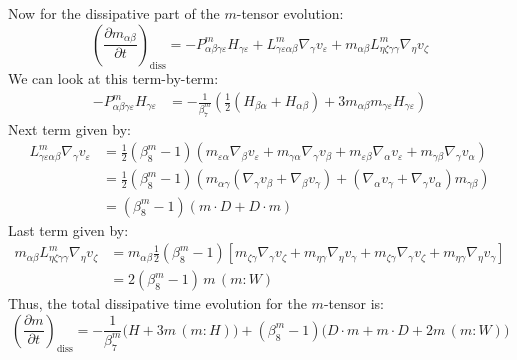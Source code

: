 \documentclass[reqno]{article}
\begin{document}
  Now for the dissipative part of the $m$-tensor evolution:
  \begin{equation}
    \left( \frac{\partial m_{\alpha\beta}}{\partial t} \right)_\text{diss}
    =
    - P^m_{\alpha\beta\gamma\varepsilon} H_{\gamma\varepsilon}
    + L^m_{\gamma\varepsilon\alpha\beta} \nabla_\gamma v_\varepsilon
    + m_{\alpha\beta} L^m_{\eta\zeta\gamma\gamma} \nabla_\eta v_\zeta
  \end{equation}
  We can look at this term-by-term:
  \begin{equation}
    \begin{split}
      - P^m_{\alpha\beta\gamma\varepsilon} H_{\gamma\varepsilon}
      &=
      - \frac{1}{\beta^m_7} \left( \tfrac12 \left(
        H_{\beta \alpha}
        + H_{\alpha\beta}
      \right)
      + 3 m_{\alpha\beta} m_{\gamma\varepsilon} H_{\gamma\varepsilon}
      \right)
    \end{split}
  \end{equation}
  Next term given by:
  \begin{equation}
    \begin{split}
    L^m_{\gamma\varepsilon\alpha\beta} \nabla_\gamma v_\varepsilon
    &= 
    \tfrac12 \left( \beta^m_8 - 1 \right)
    \left(
      m_{\varepsilon\alpha} \nabla_\beta v_\varepsilon
      + m_{\gamma\alpha} \nabla_\gamma v_\beta
      + m_{\varepsilon\beta} \nabla_\alpha v_\varepsilon
      + m_{\gamma\beta} \nabla_\gamma v_\alpha
    \right) \\
    &=
    \tfrac12 \left( \beta^m_8 - 1 \right)
    \left(
      m_{\alpha\gamma} \left(
        \nabla_\gamma v_\beta
        + \nabla_\beta v_\gamma
      \right)
      + 
       \left(
         \nabla_\alpha v_\gamma
         + \nabla_\gamma v_\alpha
      \right) m_{\gamma \beta}
    \right) \\
    &= \left( \beta^m_8 - 1 \right) \left( m \cdot D + D \cdot m \right)
    \end{split}
  \end{equation}
  Last term given by:
  \begin{equation}
    \begin{split}
    m_{\alpha\beta} L^m_{\eta\zeta\gamma\gamma} \nabla_\eta v_\zeta
    &= m_{\alpha\beta} \tfrac12 \left( \beta^m_8 - 1 \right) \left[
      m_{\zeta\gamma} \nabla_\gamma v_\zeta
      + m_{\eta \gamma} \nabla_\eta v_\gamma
      + m_{\zeta\gamma} \nabla_\gamma v_\zeta
      + m_{\eta\gamma} \nabla_\eta v_\gamma
    \right] \\
    &= 2 \left( \beta^m_8 - 1 \right) \, m \, (m:W)
    \end{split}
  \end{equation}
  Thus, the total dissipative time evolution for the $m$-tensor is:
  \begin{equation}
    \left( \frac{\partial m}{\partial t} \right)_\text{diss}
    =
    - \frac{1}{\beta^m_7} \bigl(
      H + 3m \, \left( m: H \right)
    \bigr)
    + \left( \beta^m_8 - 1 \right) \bigl(
      D \cdot m + m \cdot D + 2m \, (m : W)
    \bigr)
  \end{equation}
\end{document}
